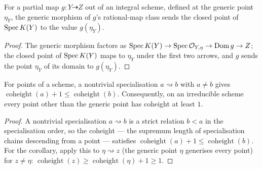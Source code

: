 \begin{lemma}
  \label{pa-lem:generic_value_bridge}
  \leanok

  For a partial map \(g : Y \dashrightarrow Z\) out of an integral scheme,
  defined at the generic point \(\eta_Y\), the generic morphism of
  \(g\)'s rational-map class sends the closed point of \(\operatorname{Spec} K(Y)\) to the
  value \(g(\eta_Y)\).
\end{lemma}
\begin{proof}
  \leanok
  The generic morphism factors as \(\operatorname{Spec} K(Y) \to \operatorname{Spec}\mathcal{O}_{Y,\eta} \to
  \operatorname{Dom} g \to Z\); the closed point of \(\operatorname{Spec} K(Y)\) maps to
  \(\eta_Y\) under the first two arrows, and \(g\) sends the point \(\eta_Y\) of
  its domain to \(g(\eta_Y)\).
\end{proof}

\begin{lemma}
  \label{pa-lem:coheight_strictness}
  \leanok

  For points of a scheme, a nontrivial specialisation \(a \rightsquigarrow b\)
  with \(a \neq b\) gives \(\operatorname{coheight}(a) + 1 \le
  \operatorname{coheight}(b)\). Consequently, on an irreducible scheme every point
  other than the generic point has coheight at least \(1\).
\end{lemma}
\begin{proof}
  \leanok
  A nontrivial specialisation \(a \rightsquigarrow b\) is a strict relation
  \(b < a\) in the specialisation order, so the coheight --- the supremum length
  of specialisation chains descending from a point --- satisfies
  \(\operatorname{coheight}(a) + 1 \le \operatorname{coheight}(b)\). For the
  corollary, apply this to \(\eta \rightsquigarrow z\) (the generic point \(\eta\)
  generises every point) for \(z \neq \eta\): \(\operatorname{coheight}(z) \ge
  \operatorname{coheight}(\eta) + 1 \ge 1\).
\end{proof}

